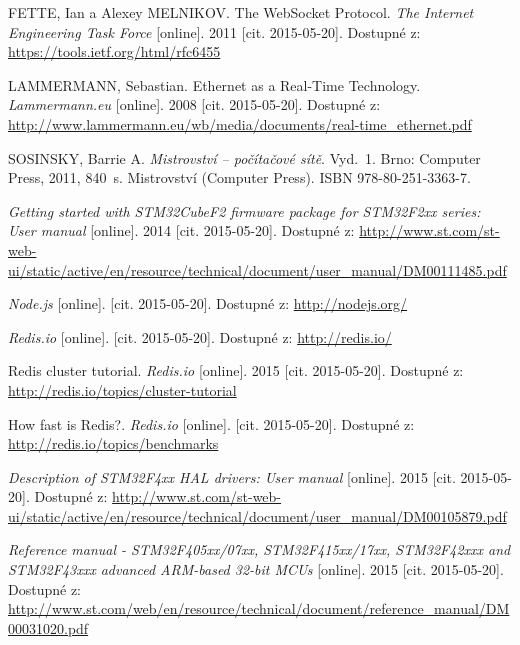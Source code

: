 \documentclass[oneside,12pt,a4paper,draft]{book} %
\begin{document}









\begin{thebibliography}{99}

FETTE, Ian a Alexey MELNIKOV. The WebSocket Protocol. \textit{The Internet Engineering Task Force} [online]. 2011 [cit. 2015-05-20]. Dostupné z: \url{https://tools.ietf.org/html/rfc6455}

LAMMERMANN, Sebastian. Ethernet as a Real-Time Technology. \textit{Lammermann.eu} [online]. 2008 [cit. 2015-05-20]. Dostupné z: \url{http://www.lammermann.eu/wb/media/documents/real-time_ethernet.pdf}

SOSINSKY, Barrie A. \textit{Mistrovství – počítačové sítě}. Vyd.~1. Brno: Computer Press, 2011, 840~s. Mistrovství (Computer Press). ISBN 978-80-251-3363-7. 

\textit{Getting started with STM32CubeF2 firmware package for STM32F2xx series: User manual} [online]. 2014 [cit. 2015-05-20]. Dostupné z: \url{http://www.st.com/st-web-ui/static/active/en/resource/technical/document/user_manual/DM00111485.pdf}

\textit{Node.js} [online]. [cit. 2015-05-20]. Dostupné z: \url{http://nodejs.org/}

\textit{Redis.io} [online]. [cit. 2015-05-20]. Dostupné z: \url{http://redis.io/}

Redis cluster tutorial. \textit{Redis.io} [online]. 2015 [cit. 2015-05-20]. Dostupné z: \url{http://redis.io/topics/cluster-tutorial}

How fast is Redis?. \textit{Redis.io} [online]. [cit. 2015-05-20]. Dostupné z: \url{http://redis.io/topics/benchmarks}

\textit{Description of STM32F4xx HAL drivers: User manual} [online]. 2015 [cit. 2015-05-20]. Dostupné z: \url{http://www.st.com/st-web-ui/static/active/en/resource/technical/document/user_manual/DM00105879.pdf}

\textit{Reference manual - STM32F405xx/07xx, STM32F415xx/17xx, STM32F42xxx and STM32F43xxx advanced ARM\textregistered-based 32-bit MCUs} [online]. 2015 [cit. 2015-05-20]. Dostupné z: \url{http://www.st.com/web/en/resource/technical/document/reference_manual/DM00031020.pdf}


\end{thebibliography}
\end{document}
